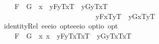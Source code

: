 \begin{isabellebody}
\ \ \ \ {\isachardoublequoteopen}F{}\ \isactrlbold {\isacharequal}\ G{}\ {\isasymequiv}\ \isactrlbold {\isasymforall}x{}{\isachardot}{\isacharparenleft}\ \ {\isacharparenleft}\isactrlbold {\isasymlambda}y{\isachardot}{\isasymlparr}F{}{\isacharcomma}y\isactrlsup T{\isacharcomma}x{}\isactrlsup T{\isasymrparr}{\isacharparenright}\ \isactrlbold {\isacharequal}\ {\isacharparenleft}\isactrlbold {\isasymlambda}y{\isachardot}{\isasymlparr}G{}{\isacharcomma}y\isactrlsup T{\isacharcomma}x{}\isactrlsup T{\isasymrparr}{\isacharparenright}\isanewline
\ \ \ \ \ \ \ \ \ \ \ \ \ \ \ \ \ \ \ \ \ \ \ \ \ \ \isactrlbold {\isasymand}\ {\isacharparenleft}\isactrlbold {\isasymlambda}y{\isachardot}{\isasymlparr}F{}{\isacharcomma}x{}\isactrlsup T{\isacharcomma}y\isactrlsup T{\isasymrparr}{\isacharparenright}\ \isactrlbold {\isacharequal}\ {\isacharparenleft}\isactrlbold {\isasymlambda}y{\isachardot}{\isasymlparr}G{}{\isacharcomma}x{}\isactrlsup T{\isacharcomma}y\isactrlsup T{\isasymrparr}{\isacharparenright}{\isacharparenright}{\isachardoublequoteclose}\isanewline
\isanewline
\ \isamarkupfalse%
\ identityRel{}{\isacharcolon}{\isacharcolon}{\isachardoublequoteopen}\ {\isacharparenleft}{\isacharparenleft}e{\isasymRightarrow}e{\isasymRightarrow}e{\isasymRightarrow}io{\isacharparenright}\ opt{\isacharparenright}{\isasymRightarrow}{\isacharparenleft}{\isacharparenleft}e{\isasymRightarrow}e{\isasymRightarrow}e{\isasymRightarrow}io{\isacharparenright}\ opt{\isacharparenright}{\isasymRightarrow}io\ opt{\isachardoublequoteclose}\ {\isacharparenleft}\ {\isachardoublequoteopen}\isactrlbold {\isacharequal}\ {}{}{\isacharparenright}\ \isanewline
\ \ \ \ {\isachardoublequoteopen}F{}\ \isactrlbold {\isacharequal}\ G{}\ {\isasymequiv}\ \isactrlbold {\isasymforall}x{}\ x{}{\isachardot}{\isacharparenleft}\ \ {\isacharparenleft}\isactrlbold {\isasymlambda}y{\isachardot}{\isasymlparr}F{}{\isacharcomma}y\isactrlsup T{\isacharcomma}x{}\isactrlsup T{\isacharcomma}x{}\isactrlsup T{\isasymrparr}{\isacharparenright}\ \isactrlbold {\isacharequal}\ {\isacharparenleft}\isactrlbold {\isasymlambda}y{\isachardot}{\isasymlparr}G{}{\isacharcomma}y\isactrlsup T{\isacharcomma}x{}\isactrlsup T{\isacharcomma}x{}\isactrlsup T{\isasymrparr}{\isacharparenright}\isanewline

\end{isabellebody}
